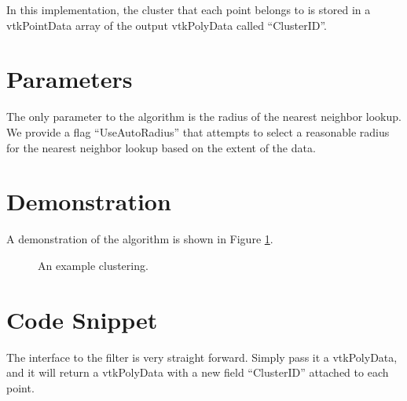 \documentclass{InsightArticle}
\begin{document}
In this implementation, the cluster that each point belongs to is stored in a vtkPointData array of the output vtkPolyData called ``ClusterID''.

\section{Parameters}
The only parameter to the algorithm is the radius of the nearest neighbor lookup. We provide a flag ``UseAutoRadius'' that attempts to select a reasonable radius for the nearest neighbor lookup based on the extent of the data.

\section{Demonstration}

A demonstration of the algorithm is shown in Figure \ref{fig:Demo}.

\begin{figure}[H]
\centering
{}
\caption{An example clustering.}
\label{fig:Demo}
\end{figure}

\section{Code Snippet}
The interface to the filter is very straight forward. Simply pass it a vtkPolyData, and it will return a vtkPolyData with a new field ``ClusterID'' attached to each point.
\end{document}
